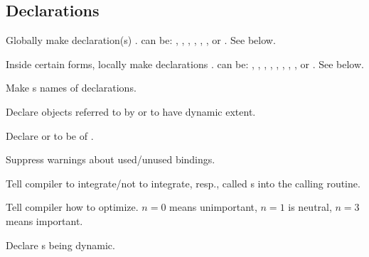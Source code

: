 \subsection{Declarations}
\begin{LIST}{1cm}

  Globally make declaration(s) .  can be:
  ,      
  ,
  ,           
  ,   
  ,
  , or
  .
  See below.

  Inside certain forms, locally make declarations .  can be:
  ,
  ,
  ,           
  ,       
  ,     
  ,     
  ,  
  , or
  .
  See below.      
  
  \begin{LIST}{.5cm}
    
    Make s names of declarations.
    
    Declare objects referred to by  or  to have
    dynamic extent. 

    Declare  or  to be of .

    Suppress warnings about used/unused bindings.

    Tell compiler to integrate/not to integrate, resp., called
    s into the calling routine.

    Tell compiler how to optimize. $n=0$ means unimportant, $n=1$ is
    neutral, $n=3$ means important.

    Declare s being dynamic.

  \end{LIST}
\end{LIST}



